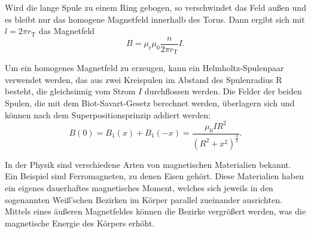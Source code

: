 Wird die lange Spule zu einem Ring gebogen, so verschwindet das Feld außen und es bleibt nur das homogene Magnetfeld innerhalb des Torus. Dann ergibt sich mit
$l = 2\pi r_{\text{T}}$ das Magnetfeld
\begin{equation}
B = \mu_{\text{r}} \mu_0 \frac{n}{2\pi r_{\text{T}}} I.
\end{equation}

Um ein homogenes Magnetfeld zu erzeugen, kann ein Helmholtz-Spulenpaar verwendet werden, das aus zwei Kreispulen im Abstand des Spulenradius R besteht, die 
gleichsinnig vom Strom $I$ durchflossen werden. Die Felder der beiden Spulen, die mit dem Biot-Savart-Gesetz berechnet werden, überlagern sich und können nach dem 
Superpositionsprinzip addiert werden:
\begin{equation}
B(0) = B_1(x) + B_1(-x) = \frac{\mu_0 I R^2}{(R^2 + x^2)^{\frac{3}{2}}}.
\end{equation}

In der Physik sind verschiedene Arten von magnetischen Materialien bekannt. Ein Beispiel sind Ferromagneten, zu denen Eisen gehört. Diese Materialien haben ein
eigenes dauerhaftes magnetisches Moment, welches sich jeweils in den sogenannten Weiß'schen Bezirken im Körper parallel zueinander ausrichten. Mittels eines äußeren
Magnetfeldes können die Bezirke vergrößert werden, was die magnetische Energie des Körpers erhöht.

